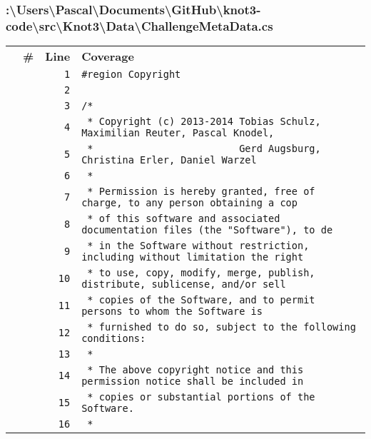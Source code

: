 \documentclass[a4paper,10pt]{article}
\begin{document}
\subsubsection{:\textbackslash Users\textbackslash Pascal\textbackslash Documents\textbackslash GitHub\textbackslash knot3-code\textbackslash src\textbackslash Knot3\textbackslash Data\textbackslash ChallengeMetaData.cs}
\begin{longtable}[l]{lrrl}
\textbf{} & \textbf{\#} & \textbf{Line} & \textbf{Coverage}\\
\cellcolor{gray} &  & \verb~1~ & \verb~#region Copyright~\\
\cellcolor{gray} &  & \verb~2~ & \verb~~\\
\cellcolor{gray} &  & \verb~3~ & \verb~/*~\\
\cellcolor{gray} &  & \verb~4~ & \verb~ * Copyright (c) 2013-2014 Tobias Schulz, Maximilian Reuter, Pascal Knodel,~\\
\cellcolor{gray} &  & \verb~5~ & \verb~ *                         Gerd Augsburg, Christina Erler, Daniel Warzel~\\
\cellcolor{gray} &  & \verb~6~ & \verb~ *~\\
\cellcolor{gray} &  & \verb~7~ & \verb~ * Permission is hereby granted, free of charge, to any person obtaining a cop~\\
\cellcolor{gray} &  & \verb~8~ & \verb~ * of this software and associated documentation files (the "Software"), to de~\\
\cellcolor{gray} &  & \verb~9~ & \verb~ * in the Software without restriction, including without limitation the right~\\
\cellcolor{gray} &  & \verb~10~ & \verb~ * to use, copy, modify, merge, publish, distribute, sublicense, and/or sell~\\
\cellcolor{gray} &  & \verb~11~ & \verb~ * copies of the Software, and to permit persons to whom the Software is~\\
\cellcolor{gray} &  & \verb~12~ & \verb~ * furnished to do so, subject to the following conditions:~\\
\cellcolor{gray} &  & \verb~13~ & \verb~ *~\\
\cellcolor{gray} &  & \verb~14~ & \verb~ * The above copyright notice and this permission notice shall be included in ~\\
\cellcolor{gray} &  & \verb~15~ & \verb~ * copies or substantial portions of the Software.~\\
\cellcolor{gray} &  & \verb~16~ & \verb~ *~\\

\end{longtable}
\end{document}

